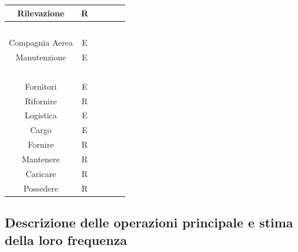 \begin{tabular}{ | c  c  c | c  c  c | }
	\hline
	\textsf{\small Rilevazione} & \textsf{\small R} & \textsf{\small $ $} & \textsf{\small } & \textsf{\small } & \textsf{\small $ $}\\
	\hline
	\textsf{\small } & \textsf{\small } & \textsf{\small $ $} & \textsf{\small } & \textsf{\small } & \textsf{\small $ $}\\
	\hline
	\textsf{\small Compagnia Aerea} & \textsf{\small E} & \textsf{\small $ $} & \textsf{\small } & \textsf{\small } & \textsf{\small $ $}\\
	\hline
	\textsf{\small Manutenzione} & \textsf{\small E} & \textsf{\small $ $} & \textsf{\small } & \textsf{\small } & \textsf{\small $ $}\\
	\hline
	\textsf{\small } & \textsf{\small } & \textsf{\small $ $} & \textsf{\small } & \textsf{\small } & \textsf{\small $ $}\\
	\hline
	\textsf{\small Fornitori} & \textsf{\small E} & \textsf{\small $ $} & \textsf{\small } & \textsf{\small } & \textsf{\small $ $}\\
	\hline
	\textsf{\small Rifornire} & \textsf{\small R} & \textsf{\small $ $} & \textsf{\small } & \textsf{\small } & \textsf{\small $ $}\\
	\hline
	\textsf{\small Logistica} & \textsf{\small E} & \textsf{\small $ $} & \textsf{\small } & \textsf{\small } & \textsf{\small $ $}\\
	\hline
	\textsf{\small Cargo} & \textsf{\small E} & \textsf{\small $ $} & \textsf{\small } & \textsf{\small } & \textsf{\small $ $}\\
	\hline
	\textsf{\small Fornire} & \textsf{\small R} & \textsf{\small $ $} & \textsf{\small } & \textsf{\small } & \textsf{\small $ $}\\
	\hline
	\textsf{\small Mantenere} & \textsf{\small R} & \textsf{\small $ $} & \textsf{\small } & \textsf{\small } & \textsf{\small $ $}\\
	\hline
	\textsf{\small Caricare} & \textsf{\small R} & \textsf{\small $ $} & \textsf{\small } & \textsf{\small } & \textsf{\small $ $}\\
	\hline
	\textsf{\small Possedere} & \textsf{\small R} & \textsf{\small $ $} & \textsf{\small } & \textsf{\small } & \textsf{\small $ $}\\
	\hline
\end{tabular}


\newpage

\subsection{Descrizione delle operazioni principale e stima della loro frequenza}

